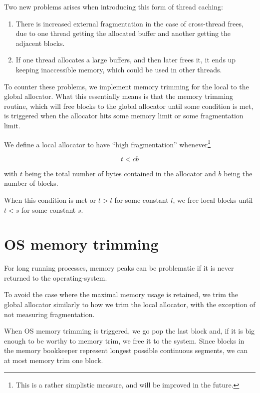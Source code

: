 \documentclass[11pt]{article}
\begin{document}
    Two new problems arises when introducing this form of thread caching:

    \begin{enumerate}
        \item There is increased external fragmentation in the case of
            cross-thread frees, due to one thread getting the allocated buffer
            and another getting the adjacent blocks.
        \item If one thread allocates a large buffers, and then later frees it,
            it ends up keeping inaccessible memory, which could be used in
            other threads.
    \end{enumerate}

    To counter these problems, we implement memory trimming for the local to
    the global allocator. What this essentially means is that the memory
    trimming routine, which will free blocks to the global allocator until some
    condition is met, is triggered when the allocator hits some memory limit or
    some fragmentation limit.

    We define a local allocator to have ``high fragmentation''
    whenever\footnote{This is a rather simplistic measure, and will be improved
        in the future.}

    $$
        t < cb
    $$

    with $ t $ being the total number of bytes contained in the allocator and $
    b $ being the number of blocks.

    When this condition is met or $ t > l $ for some constant $ l $, we free
    local blocks until $ t < s $ for some constant $ s $.

    \section{OS memory trimming}
    For long running processes, memory peaks can be problematic if it is never
    returned to the operating-system.

    To avoid the case where the maximal memory usage is retained, we trim the
    global allocator similarly to how we trim the local allocator, with the
    exception of not measuring fragmentation.

    When OS memory trimming is triggered, we go pop the last block and, if it
    is big enough to be worthy to memory trim, we free it to the system. Since
    blocks in the memory bookkeeper represent longest possible continuous
    segments, we can at most memory trim one block.
\end{document}
